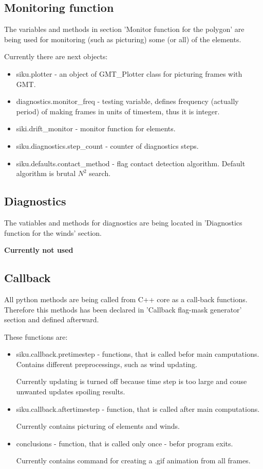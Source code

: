 \subsection{Monitoring function}

The variables and methods in section 'Monitor function for the polygon'
are being used for monitoring (such as picturing) some (or all) of the 
elements. 

Currently there are next objects:
\begin{itemize}
 \item siku.plotter - an object of GMT\_Plotter class for picturing frames
 with GMT.
 \item diagnostics.monitor\_freq - testing variable, defines frequency
 (actually period) of making frames in units of timestem, thus it is integer.
 \item siki.drift\_monitor - monitor function for elements.
 \item siku.diagnostics.step\_count - counter of diagnostics steps.
 \item siku.defaults.contact\_method - flag contact detection algorithm. 
 Default algorithm is brutal $N^2$ search.
\end{itemize}

\subsection{Diagnostics}

The vatiables and methods for diagnostics are being located in 'Diagnostics 
function for the winds' section.

\textbf{Currently not used}

\subsection{Callback}

All python methods are being called from C++ core as a call-back functions.
Therefore this methods has been declared in 'Callback flag-mask generator'
section and defined afterward.

These functions are:
\begin{itemize}
 \item siku.callback.pretimestep - functions, that is called befor main 
 camputations. Contains different preprocessings, such as wind updating.
 
 Currently updating is turned off because time step is too large and couse 
 unwanted updates spoiling results.
 \item siku.callback.aftertimestep - function, that is called after main
 computations. 
 
 Currently contains picturing of elements and winds.
 \item conclusions - function, that is called only once - befor program 
 exits. 
 
 Currently contains command for creating a .gif animation from all frames.
\end{itemize}

